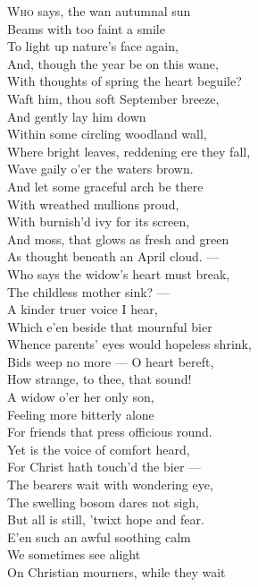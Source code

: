 \textsc{Who} says, the wan autumnal sun \\
 Beams with too faint a smile \\
 To light up nature’s face again, \\
 And, though the year be on this wane, \\
 With thoughts of spring the heart beguile? \\
  Waft him, thou soft September breeze, \\
 And gently lay him down \\
 Within some circling woodland wall, \\
 Where bright leaves, reddening ere they fall, \\
 Wave gaily o’er the waters brown. \\
  And let some graceful arch be there \\
 With wreathed mullions proud, \\
 With burnish’d ivy for its screen, \\
 And moss, that glows as fresh and green \\
 As thought beneath an April cloud. — \\
  Who says the widow’s heart must break, \\
 The childless mother sink? — \\
 A kinder truer voice I hear, \\
 Which e’en beside that mournful bier \\
 Whence parents’ eyes would hopeless shrink, \\
  Bids weep no more — O heart bereft, \\
 How strange, to thee, that sound! \\
 A widow o’er her only son, \\
 Feeling more bitterly alone \\
 For friends that press officious round. \\
  Yet is the voice of comfort heard, \\
 For Christ hath touch’d the bier — \\
 The bearers wait with wondering eye, \\
 The swelling bosom dares not sigh, \\
 But all is still, ’twixt hope and fear. \\
  E’en such an awful soothing calm \\
 We sometimes see alight \\
 On Christian mourners, while they wait \\
